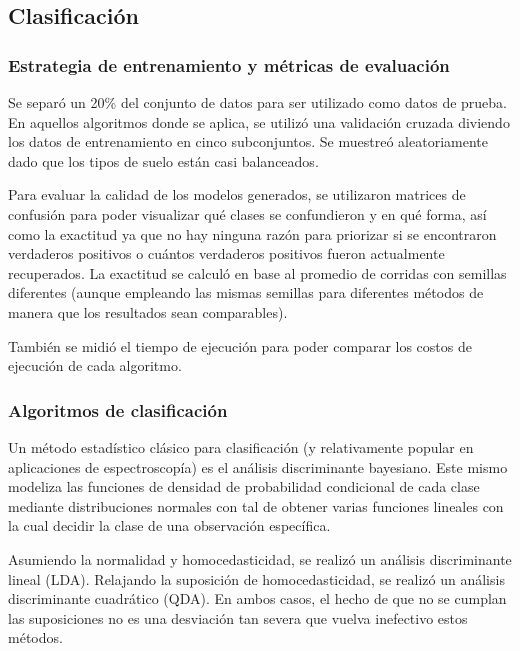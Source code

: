\documentclass[12pt]{article}
\begin{document}
\subsection{Clasificación}
\subsubsection{Estrategia de entrenamiento y métricas de evaluación}
Se separó un 20\% del conjunto de datos para ser utilizado como datos de prueba. En aquellos algoritmos donde se aplica, se utilizó una validación cruzada diviendo los datos de entrenamiento en cinco subconjuntos. Se muestreó aleatoriamente dado que los tipos de suelo están casi balanceados.

Para evaluar la calidad de los modelos generados, se utilizaron matrices de confusión para poder visualizar qué clases se confundieron y en qué forma, así como la exactitud ya que no hay ninguna razón para priorizar si se encontraron verdaderos positivos o cuántos verdaderos positivos fueron actualmente recuperados. La exactitud se calculó en base al promedio de corridas con semillas diferentes (aunque empleando las mismas semillas para diferentes métodos de manera que los resultados sean comparables).

También se midió el tiempo de ejecución para poder comparar los costos de ejecución de cada algoritmo.
\subsubsection{Algoritmos de clasificación}
Un método estadístico clásico para clasificación (y relativamente popular en aplicaciones de espectroscopía) es el análisis discriminante bayesiano. Este mismo modeliza las funciones de densidad de probabilidad condicional de cada clase mediante distribuciones normales con tal de obtener varias funciones lineales con la cual decidir la clase de una observación específica. 

Asumiendo la normalidad y homocedasticidad, se realizó un análisis discriminante lineal (LDA). Relajando la suposición de homocedasticidad, se realizó un análisis discriminante cuadrático (QDA). En ambos casos, el hecho de que no se cumplan las suposiciones no es una desviación tan severa que vuelva inefectivo estos métodos. 

\end{document}

